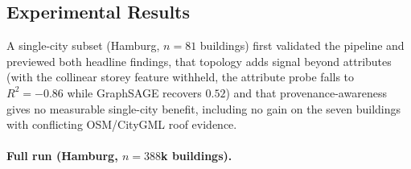 \documentclass[sigconf,authordraft]{acmart}
\begin{document}
\subsection{Experimental Results}
\label{sec:repL:results}
A single-city subset (Hamburg, $n=81$ buildings) first validated the pipeline and previewed both headline findings, that topology adds signal beyond attributes (with the collinear storey feature withheld, the attribute probe falls to $R^2{=}\num{-0.86}$ while GraphSAGE recovers $\num{0.52}$) and that provenance-awareness gives no measurable single-city benefit, including no gain on the seven buildings with conflicting OSM/CityGML roof evidence.

\paragraph{Full run (Hamburg, $n{=}388$k buildings).}
\end{document}
